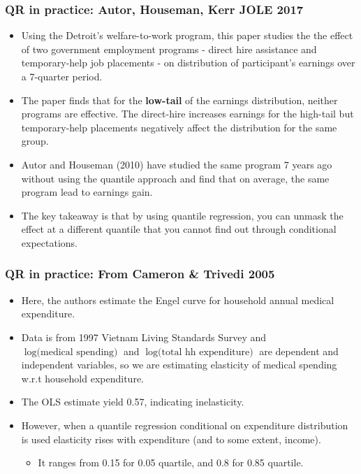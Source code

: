 \documentclass[aspectratio=169]{beamer}
\begin{document}
\begin{frame}
\frametitle{QR in practice: Autor, Houseman, Kerr JOLE 2017}
\begin{itemize}
\item Using the Detroit's welfare-to-work program, this paper studies the the effect of two government employment programs - direct hire assistance and temporary-help job placements - on distribution of participant's earnings over a 7-quarter period. 
\item The paper finds that for the \textbf{low-tail} of the earnings distribution, neither programs are effective. The direct-hire increases earnings for the high-tail but temporary-help placements negatively affect the distribution for the same group.  
\item Autor and Houseman (2010) have studied the same program 7 years ago without using the quantile approach and find that on average, the same program lead to earnings gain. 
\item The key takeaway is that by using quantile regression, you can unmask the effect at a different quantile that you cannot find out through conditional expectations. 
\end{itemize}
\end{frame}

\begin{frame}
\frametitle{QR in practice: From Cameron \& Trivedi 2005}
\begin{itemize}
\item Here, the authors estimate the Engel curve for household annual medical expenditure. 
\item Data is from 1997 Vietnam Living Standards Survey and $\log{\text{(medical spending)}}$ and $\log{\text{(total hh expenditure)}}$ are dependent and independent variables, so we are estimating elasticity of medical spending w.r.t household expenditure. 
\item The OLS estimate yield 0.57, indicating inelasticity.  
\item However, when a quantile regression conditional on expenditure distribution is used elasticity rises with expenditure (and to some extent, income). 
\begin{itemize}
\item It ranges from 0.15 for 0.05 quartile, and 0.8 for 0.85 quartile. 
\end{itemize}
\end{itemize}
\end{frame}
\end{document}
